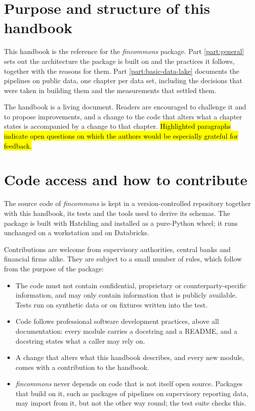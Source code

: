 \documentclass[a4paper, 11pt]{report}
\begin{document}
\section{Purpose and structure of this handbook\label{sec:intro-purpose}}

This handbook is the reference for the \emph{fincommons} package. Part \ref{part:general} sets out the architecture the package is built on and the practices it follows, together with the reasons for them. Part \ref{part:basic-data-lake} documents the pipelines on public data, one chapter per data set, including the decisions that were taken in building them and the measurements that settled them.

The handbook is a living document. Readers are encouraged to challenge it and to propose improvements, and a change to the code that alters what a chapter states is accompanied by a change to that chapter. \hl{Highlighted paragraphs indicate open questions on which the authors would be especially grateful for feedback.}


\section{Code access and how to contribute\label{sec:intro-contribute}}

The source code of \emph{fincommons} is kept in a version-controlled repository together with this handbook, its tests and the tools used to derive its schemas. The package is built with Hatchling and installed as a pure-Python wheel; it runs unchanged on a workstation and on Databricks.

Contributions are welcome from supervisory authorities, central banks and financial firms alike. They are subject to a small number of rules, which follow from the purpose of the package:
%
\begin{itemize}
	\item The code must not contain confidential, proprietary or counterparty-specific information, and may only contain information that is publicly available. Tests run on synthetic data or on fixtures written into the test.
	\item Code follows professional software development practices, above all documentation: every module carries a docstring and a README, and a docstring states what a caller may rely on.
	\item A change that alters what this handbook describes, and every new module, comes with a contribution to the handbook.
	\item \emph{fincommons} never depends on code that is not itself open source. Packages that build on it, such as packages of pipelines on supervisory reporting data, may import from it, but not the other way round; the test suite checks this.
\end{itemize}
\end{document}
